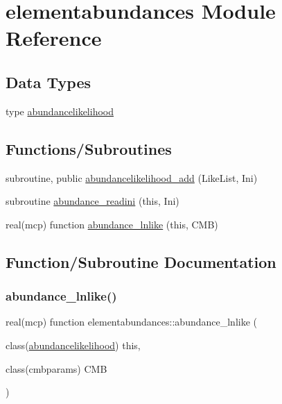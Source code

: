 \hypertarget{namespaceelementabundances}{}\section{elementabundances Module Reference}
\label{namespaceelementabundances}
\subsection*{Data Types}
\begin{DoxyCompactItemize}
\item 
type \mbox{\hyperlink{structelementabundances_1_1abundancelikelihood}{abundancelikelihood}}
\end{DoxyCompactItemize}
\subsection*{Functions/\+Subroutines}
\begin{DoxyCompactItemize}
\item 
subroutine, public \mbox{\hyperlink{namespaceelementabundances_ab38dda4bf7a9aec310c4b1f93a4b51b0}{abundancelikelihood\+\_\+add}} (Like\+List, Ini)
\item 
subroutine \mbox{\hyperlink{namespaceelementabundances_a72d18f9f5d0b7db26c7bca022a12e566}{abundance\+\_\+readini}} (this, Ini)
\item 
real(mcp) function \mbox{\hyperlink{namespaceelementabundances_af926a0605dc16619d37dee5ad1658bba}{abundance\+\_\+lnlike}} (this, C\+MB)
\end{DoxyCompactItemize}


\subsection{Function/\+Subroutine Documentation}
\mbox{\label{namespaceelementabundances_af926a0605dc16619d37dee5ad1658bba}} 
\subsubsection{\texorpdfstring{abundance\+\_\+lnlike()}{abundance\_lnlike()}}
{\footnotesize\ttfamily real(mcp) function elementabundances\+::abundance\+\_\+lnlike (\begin{DoxyParamCaption}\item[{class(\mbox{\hyperlink{structelementabundances_1_1abundancelikelihood}{abundancelikelihood}})}]{this,  }\item[{class(cmbparams)}]{C\+MB }\end{DoxyParamCaption})\hspace{0.3cm}{\ttfamily [private]}}



